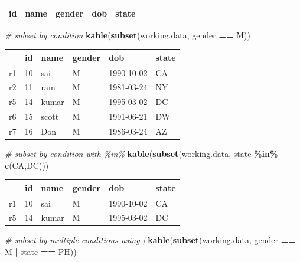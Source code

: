\documentclass[
]{book}
\newenvironment{Shaded}{\begin{snugshade}}{\end{snugshade}}
\newcommand{\CommentTok}[1]{\textcolor[rgb]{0.56,0.35,0.01}{\textit{#1}}}
\newcommand{\FunctionTok}[1]{\textcolor[rgb]{0.13,0.29,0.53}{\textbf{#1}}}
\newcommand{\NormalTok}[1]{#1}
\newcommand{\SpecialCharTok}[1]{\textcolor[rgb]{0.81,0.36,0.00}{\textbf{#1}}}
\newcommand{\StringTok}[1]{\textcolor[rgb]{0.31,0.60,0.02}{#1}}
\begin{document}
\begin{tabular}{r|l|l|l|l}
\hline
id & name & gender & dob & state\\


\hline
\end{tabular}

\begin{Shaded}
\begin{Highlighting}[]
\CommentTok{\# subset by condition}
\FunctionTok{kable}\NormalTok{(}\FunctionTok{subset}\NormalTok{(working.data, gender }\SpecialCharTok{==} \StringTok{\textquotesingle{}M\textquotesingle{}}\NormalTok{))}
\end{Highlighting}
\end{Shaded}

\begin{tabular}{l|r|l|l|l|l}
\hline
  & id & name & gender & dob & state\\
\hline
r1 & 10 & sai & M & 1990-10-02 & CA\\
\hline
r2 & 11 & ram & M & 1981-03-24 & NY\\
\hline
r5 & 14 & kumar & M & 1995-03-02 & DC\\
\hline
r6 & 15 & scott & M & 1991-06-21 & DW\\
\hline
r7 & 16 & Don & M & 1986-03-24 & AZ\\
\hline
\end{tabular}

\begin{Shaded}
\begin{Highlighting}[]
\CommentTok{\# subset by condition with \%in\%}
\FunctionTok{kable}\NormalTok{(}\FunctionTok{subset}\NormalTok{(working.data, state }\SpecialCharTok{\%in\%} \FunctionTok{c}\NormalTok{(}\StringTok{\textquotesingle{}CA\textquotesingle{}}\NormalTok{,}\StringTok{\textquotesingle{}DC\textquotesingle{}}\NormalTok{)))}
\end{Highlighting}
\end{Shaded}

\begin{tabular}{l|r|l|l|l|l}
\hline
  & id & name & gender & dob & state\\
\hline
r1 & 10 & sai & M & 1990-10-02 & CA\\
\hline
r5 & 14 & kumar & M & 1995-03-02 & DC\\
\hline
\end{tabular}

\begin{Shaded}
\begin{Highlighting}[]
\CommentTok{\# subset by multiple conditions using |}
\FunctionTok{kable}\NormalTok{(}\FunctionTok{subset}\NormalTok{(working.data, gender }\SpecialCharTok{==} \StringTok{\textquotesingle{}M\textquotesingle{}} \SpecialCharTok{|}\NormalTok{ state }\SpecialCharTok{==} \StringTok{\textquotesingle{}PH\textquotesingle{}}\NormalTok{))}
\end{Highlighting}
\end{Shaded}
\end{document}
